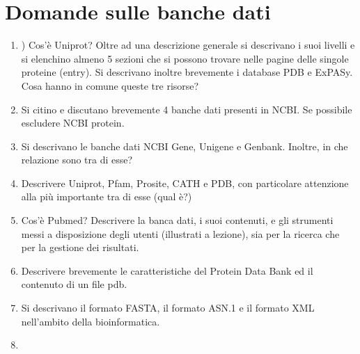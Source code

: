 \documentclass{article}
\begin{document}
\section{Domande sulle banche dati}
\begin{enumerate}
    \item ) Cos'è Uniprot? Oltre ad una descrizione generale si descrivano i suoi livelli e si elenchino almeno 5 sezioni che si possono trovare nelle pagine delle singole proteine (entry). Si descrivano inoltre brevemente i database PDB e ExPASy. Cosa hanno in comune queste tre risorse?
    \item Si citino e discutano brevemente 4 banche dati presenti in NCBI. Se possibile escludere NCBI protein.
    \item Si descrivano le banche dati NCBI Gene, Unigene e Genbank. Inoltre, in che relazione sono tra di esse?
    \item  Descrivere Uniprot, Pfam, Prosite, CATH e PDB, con particolare attenzione alla più importante tra di esse (qual è?)
    \item Cos'è Pubmed? Descrivere la banca dati, i suoi contenuti, e gli strumenti messi a disposizione degli utenti (illustrati a lezione), sia per la ricerca che per la gestione dei risultati.
    \item Descrivere brevemente le caratteristiche del Protein Data Bank ed il contenuto di un file pdb.
    \item Si descrivano il formato FASTA, il formato ASN.1 e il formato XML nell'ambito della bioinformatica.
    \item 
\end{enumerate}
\end{document}
